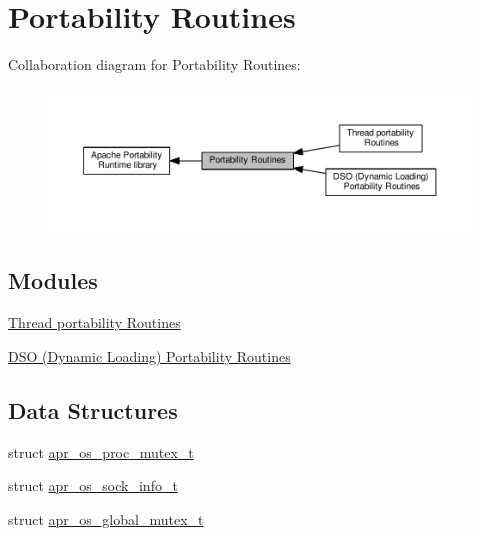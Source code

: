 \hypertarget{group__apr__portabile}{}\section{Portability Routines}
\label{group__apr__portabile}
Collaboration diagram for Portability Routines\+:
\nopagebreak
\begin{figure}[H]
\begin{center}
\leavevmode
\includegraphics[width=350pt]{group__apr__portabile}
\end{center}
\end{figure}
\subsection*{Modules}
\begin{DoxyCompactItemize}
\item 
\hyperlink{group__apr__os__thread}{Thread portability Routines}
\item 
\hyperlink{group__apr__os__dso}{D\+S\+O (\+Dynamic Loading) Portability Routines}
\end{DoxyCompactItemize}
\subsection*{Data Structures}
\begin{DoxyCompactItemize}
\item 
struct \hyperlink{structapr__os__proc__mutex__t}{apr\+\_\+os\+\_\+proc\+\_\+mutex\+\_\+t}
\item 
struct \hyperlink{structapr__os__sock__info__t}{apr\+\_\+os\+\_\+sock\+\_\+info\+\_\+t}
\item 
struct \hyperlink{structapr__os__global__mutex__t}{apr\+\_\+os\+\_\+global\+\_\+mutex\+\_\+t}
\end{DoxyCompactItemize}
